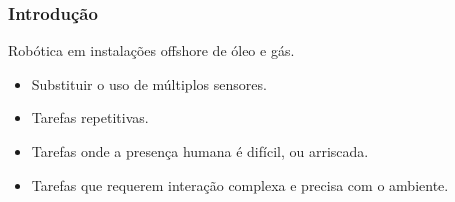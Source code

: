\documentclass{beamer}
\begin{document}
\begin{frame}
\frametitle{Introdução}
Robótica em instalações offshore de óleo e gás.
\begin{itemize}
\item Substituir o uso de múltiplos sensores.
\item Tarefas repetitivas.
\item Tarefas onde a presença humana é difícil, ou arriscada.
\item Tarefas que requerem interação complexa e precisa com o ambiente.
\end{itemize}

\newlength{\twosubht}
\newsavebox{\twosubbox}

\begin{figure}[htp]
\sbox{}
\setlength{\twosubht}{\ht\twosubbox}
\centering
{}\quad
{}
\end{figure}
\end{frame}
\end{document}
